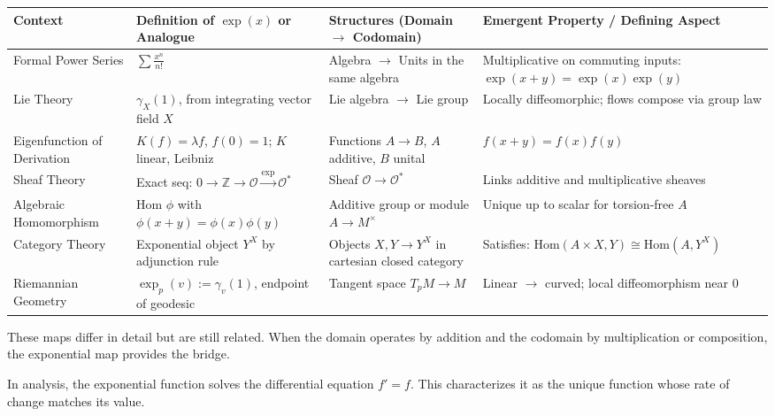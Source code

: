 \begin{center}
\renewcommand{\arraystretch}{1.5}
\setlength{\tabcolsep}{2pt}
\footnotesize
\begin{tabular}{|>{\centering\arraybackslash}m{2.0cm}|>{\centering\arraybackslash}m{2.8cm}|>{\centering\arraybackslash}m{3.8cm}|>{\centering\arraybackslash}m{4.2cm}|}
\hline
\textbf{Context} &
\textbf{Definition of \( \exp(x) \) or Analogue} &
\textbf{Structures (Domain \( \to \) Codomain)} &
\textbf{Emergent Property / Defining Aspect} \\
\hline
Formal Power Series &
\( \sum \frac{x^n}{n!} \) &
Algebra \( \to \) Units in the same algebra &
Multiplicative on commuting inputs: \( \exp(x+y) = \exp(x)\exp(y) \) \\
\hline
Lie Theory &
\( \gamma_X(1) \), from integrating vector field \( X \) &
Lie algebra \( \to \) Lie group &
Locally diffeomorphic; flows compose via group law \\
\hline
Eigenfunction of Derivation &
\( K(f) = \lambda f \), \( f(0) = 1 \); \( K \) linear, Leibniz &
Functions \( A \to B \), \( A \) additive, \( B \) unital &
\( f(x+y) = f(x)f(y) \) \\
\hline
Sheaf Theory &
Exact seq: \( 0 \to \mathbb{Z} \to \mathcal{O} \xrightarrow{\exp} \mathcal{O}^* \) &
Sheaf \( \mathcal{O} \to \mathcal{O}^* \) &
Links additive and multiplicative sheaves \\
\hline
Algebraic Homomorphism &
Hom \( \phi \) with \( \phi(x+y) = \phi(x)\phi(y) \) &
Additive group or module \( A \to M^\times \) &
Unique up to scalar for torsion-free \( A \) \\
\hline
Category Theory &
Exponential object \( Y^X \) by adjunction rule &
Objects \( X, Y \to Y^X \) in cartesian closed category &
Satisfies: \( \mathrm{Hom}(A \times X, Y) \cong \mathrm{Hom}(A, Y^X) \) \\
\hline
Riemannian Geometry &
\( \exp_p(v) := \gamma_v(1) \), endpoint of geodesic &
Tangent space \( T_p M \to M \) &
Linear \(\to\) curved; local diffeomorphism near \( 0 \) \\
\hline
\end{tabular}
\end{center}

These maps differ in detail but are still related. When the domain operates by addition and the codomain by multiplication or composition, the exponential map provides the bridge.

In analysis, the exponential function solves the differential equation \( f' = f \). This characterizes it as the unique function whose rate of change matches its value.

